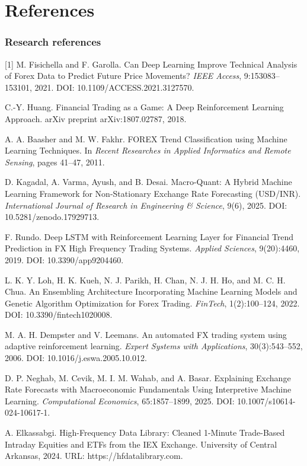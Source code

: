 \documentclass[12pt,a4paper,twoside,openany]{report}
\newcommand{\frontchapter}[1]{\chapter*{#1}\addcontentsline{toc}{chapter}{#1}}
\begin{document}
\frontchapter{References}
\subsection*{Research references}
[1] M. Fisichella and F. Garolla. Can Deep Learning Improve Technical Analysis of Forex Data to Predict Future Price Movements? \textit{IEEE Access}, 9:153083--153101, 2021. DOI: 10.1109/ACCESS.2021.3127570.\par
[2] C.-Y. Huang. Financial Trading as a Game: A Deep Reinforcement Learning Approach. arXiv preprint arXiv:1807.02787, 2018.\par
[3] A. A. Baasher and M. W. Fakhr. FOREX Trend Classification using Machine Learning Techniques. In \textit{Recent Researches in Applied Informatics and Remote Sensing}, pages 41--47, 2011.\par
[4] D. Kagadal, A. Varma, Ayush, and B. Desai. Macro-Quant: A Hybrid Machine Learning Framework for Non-Stationary Exchange Rate Forecasting (USD/INR). \textit{International Journal of Research in Engineering \& Science}, 9(6), 2025. DOI: 10.5281/zenodo.17929713.\par
[5] F. Rundo. Deep LSTM with Reinforcement Learning Layer for Financial Trend Prediction in FX High Frequency Trading Systems. \textit{Applied Sciences}, 9(20):4460, 2019. DOI: 10.3390/app9204460.\par
[6] L. K. Y. Loh, H. K. Kueh, N. J. Parikh, H. Chan, N. J. H. Ho, and M. C. H. Chua. An Ensembling Architecture Incorporating Machine Learning Models and Genetic Algorithm Optimization for Forex Trading. \textit{FinTech}, 1(2):100--124, 2022. DOI: 10.3390/fintech1020008.\par
[7] M. A. H. Dempster and V. Leemans. An automated FX trading system using adaptive reinforcement learning. \textit{Expert Systems with Applications}, 30(3):543--552, 2006. DOI: 10.1016/j.eswa.2005.10.012.\par
[8] D. P. Neghab, M. Cevik, M. I. M. Wahab, and A. Basar. Explaining Exchange Rate Forecasts with Macroeconomic Fundamentals Using Interpretive Machine Learning. \textit{Computational Economics}, 65:1857--1899, 2025. DOI: 10.1007/s10614-024-10617-1.\par
[9] A. Elkassabgi. High-Frequency Data Library: Cleaned 1-Minute Trade-Based Intraday Equities and ETFs from the IEX Exchange. University of Central Arkansas, 2024. URL: https://hfdatalibrary.com.\par
\end{document}
